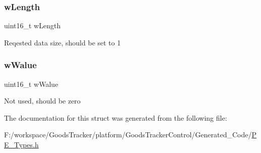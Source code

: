 \subsubsection{\texorpdfstring{w\+Length}{wLength}}
{\footnotesize\ttfamily uint16\+\_\+t w\+Length}

Reqested data size, should be set to 1 \mbox{\label{struct_l_d_d___u_s_b___t_get_interface_request___struct_aac9a6f9b53fad87aa679e25f4cc7e74d}} 
\subsubsection{\texorpdfstring{w\+Walue}{wWalue}}
{\footnotesize\ttfamily uint16\+\_\+t w\+Walue}

Not used, should be zero 

The documentation for this struct was generated from the following file\+:\begin{DoxyCompactItemize}
\item 
F\+:/workspace/\+Goods\+Tracker/platform/\+Goods\+Tracker\+Control/\+Generated\+\_\+\+Code/\hyperlink{_p_e___types_8h}{P\+E\+\_\+\+Types.\+h}\end{DoxyCompactItemize}

